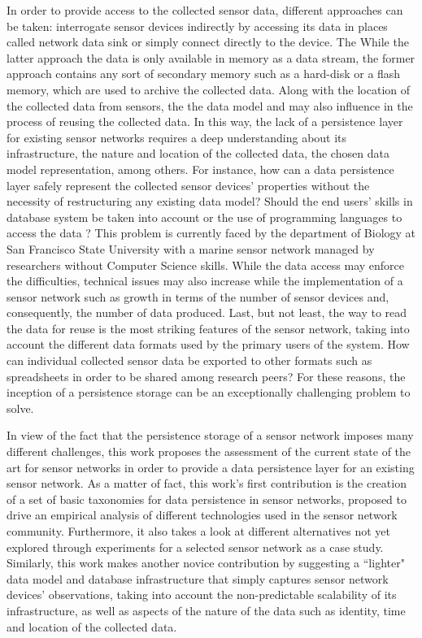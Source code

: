 In order to provide access to the collected sensor data, different approaches
can be taken: interrogate sensor devices indirectly by accessing its data in
places called network data sink or simply connect directly to the device. The 
While the latter approach the data is only available in memory as a data
stream, the former approach contains any sort of secondary memory such as a
hard-disk or a flash memory, which are used to archive the collected data.
Along with the location of the collected data from sensors, the the data model
and may also influence in the process of reusing the collected data. In this
way, the lack of a persistence layer for existing sensor networks requires a
deep understanding about its infrastructure, the nature and location of the
collected data, the chosen data model representation, among others. For
instance, how can a data persistence layer safely represent the collected
sensor devices' properties without the necessity of restructuring any existing
data model? Should the end users' skills in database system be taken into
account or the use of programming languages to access the data
\cite{sn-programming-language}? This problem is currently faced by the
department of Biology at San Francisco State University with a marine sensor
network managed by researchers without Computer Science skills. While the data
access may enforce the difficulties, technical issues may also increase while
the implementation of a sensor network such as growth in terms of the number
of sensor devices and, consequently, the number of data produced. Last, but
not least, the way to read the data for reuse is the most striking features of
the sensor network, taking into account the different data formats used by the
primary users of the system. How can individual collected sensor data be
exported to other formats such as spreadsheets in order to be shared among
research peers? For these reasons, the inception of a persistence storage can
be an exceptionally challenging problem to solve.

In view of the fact that the persistence storage of a sensor network imposes
many different challenges, this work proposes the assessment of the current
state of the art for sensor networks in order to provide a data persistence
layer for an existing sensor network. As a matter of fact, this work's first
contribution is the creation of a set of basic taxonomies for data persistence
in sensor networks, proposed to drive an empirical analysis of different
technologies used in the sensor network community. Furthermore, it also takes a
look at different alternatives not yet explored through experiments for a
selected sensor network as a case study. Similarly, this work makes another
novice contribution by suggesting a ``lighter" data model and database
infrastructure that simply captures sensor network devices' observations,
taking into account the non-predictable scalability of its infrastructure, as
well as aspects of the nature of the data such as identity, time and location
of the collected data.

